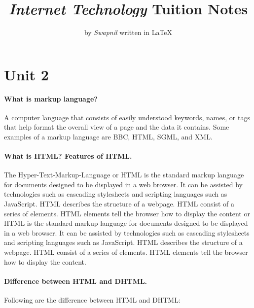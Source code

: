 \documentclass[a4paper]{article}
\title{\Huge{\emph{Internet Technology}} \normalsize{Tuition Notes}}
\author{by \huge{\emph{Swapnil}} \normalsize{written in {\LaTeX}}}
\date{}
\begin{document}
  \maketitle
  \thispagestyle{empty}

\setcounter{tocdepth}{3}
\tableofcontents
\pagebreak
\parindent0pt

\part{Unit 2}%
  \subsection{What is markup language?}%
  A computer language that consists of easily understood keywords,
  names, or tags that help format the overall view of a page and 
  the data it contains. Some examples of a markup language are BBC, 
  HTML, SGML, and XML.%

  \subsection{What is HTML? Features of HTML.}%
  The Hyper-Text-Markup-Language or HTML is the standard markup
  language for documents designed to be displayed in a web browser.
  It can be assisted by technologies such as cascading stylesheets
  and scripting languages such as JavaScript. HTML describes the
  structure of a webpage. HTML consist of a series of elements.
  HTML elements tell the browser how to display the content or HTML
  is the standard markup language for documents designed to be
  displayed in a web browser. It can be assisted by technologies such
  as cascading stylesheets and scripting languages such as JavaScript.
  HTML describes the structure of a webpage. HTML consist of a series
  of elements. HTML elements tell the browser how to display the content.%

  \subsection{Difference between HTML and DHTML.}%
  Following are the difference between HTML and DHTML:
\end{document}
